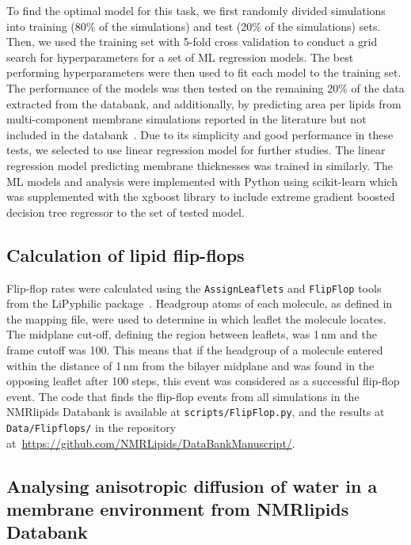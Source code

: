 \documentclass[fleqn,10pt]{wlscirep}
\begin{document}
To find the optimal model for this task, we first randomly divided simulations into training (80\% of the simulations) and test (20\% of the simulations) sets. Then, we used the training set with 5-fold cross validation to conduct a grid search for hyperparameters for a set of ML regression models. The best performing hyperparameters were then used to fit each model to the training set. The performance of the models was then tested on the remaining 20\% of the data extracted from the databank, and additionally, 
by predicting area per lipids from multi-component membrane simulations reported in the literature but not included in the databank~\cite{shahane19,kumar21,oliveira22}. Due to its  simplicity and good performance in these tests, we selected to use linear regression model for further studies. The  linear regression model predicting membrane thicknesses was trained in similarly. The ML models and analysis were implemented with Python using scikit-learn which was supplemented with the xgboost library to include extreme gradient boosted decision tree regressor to the set of tested model.

\subsection{Calculation of lipid flip-flops}
Flip-flop rates were calculated using the \texttt{AssignLeaflets} and \texttt{FlipFlop} tools from the LiPyphilic package~\cite{LiPyphilic2021}.
Headgroup atoms of each molecule, as defined in the mapping file, were used to determine in which leaflet the molecule locates. The midplane cut-off, defining the region between leaflets, was 1\,nm and the frame cutoff was 100. This means that if the headgroup of a molecule entered within the distance of 1\,nm from the bilayer midplane and was found in the opposing leaflet after 100 steps, this event was considered as a successful flip-flop event. The code that finds the flip-flop events from all simulations in the NMRlipids Databank is available at \texttt{scripts/FlipFlop.py}, and the results at \texttt{Data/Flipflops/} in the repository at~\url{https://github.com/NMRLipids/DataBankManuscript/}. 


\subsection{Analysing anisotropic diffusion of water in a membrane environment from NMRlipids Databank}
\end{document}
